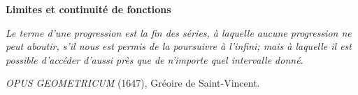 \documentclass[a4paper,11pt,reqno,french,dvipsnames,table]{article}
\begin{document}
\vspace*{\fill}

\begin{center}
	
	\Huge
	
	\textbf{Limites et continuité de fonctions}
	
\end{center}

\vspace*{\fill}

\begin{center}
	
	\parbox{0.7\textwidth}{
		\begin{center}
			\policemanuscrite
			\Large
			\textit{Le terme d'une progression est la fin des séries, à laquelle aucune progression ne peut aboutir, s'il nous est permis de la poursuivre à l'infini; mais à laquelle il est possible d'accéder d'aussi près que de n'importe quel intervalle donné.}
		\end{center}
	}
	
\end{center}

\begin{flushright}
	\textit{OPUS GEOMETRICUM} (1647), Gréoire de Saint-Vincent.
\end{flushright}

\vspace*{\fill}
\end{document}

